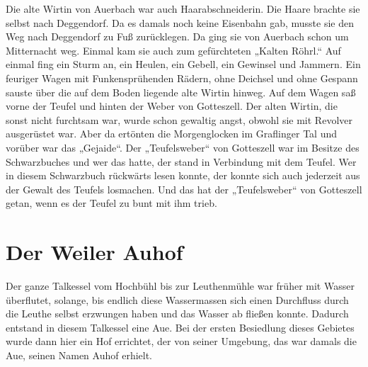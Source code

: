\documentclass[12pt,a4pager]{book}
\begin{document}
 Die alte Wirtin von Auerbach war auch Haarabschneiderin. Die Haare brachte sie
 selbst nach Deggendorf. Da es damals noch keine Eisenbahn gab, musste sie den
 Weg nach Deggendorf zu Fuß zurücklegen. Da ging sie von Auerbach schon um
 Mitternacht weg. Einmal kam sie auch zum gefürchteten „Kalten Röhrl.“ Auf
 einmal fing ein Sturm an, ein Heulen, ein Gebell, ein Gewinsel und Jammern. Ein
 feuriger Wagen mit Funkensprühenden Rädern, ohne Deichsel und ohne Gespann
 sauste über die auf dem Boden liegende alte Wirtin hinweg. Auf dem Wagen saß
 vorne der Teufel und hinten der Weber von Gotteszell. Der alten Wirtin, die
 sonst nicht furchtsam war, wurde schon gewaltig angst, obwohl sie mit Revolver
 ausgerüstet war. Aber da ertönten die Morgenglocken im Graflinger Tal und
 vorüber war das „Gejaide“. Der „Teufelsweber“ von Gotteszell war im Besitze des
 Schwarzbuches und wer das hatte, der stand in Verbindung mit dem Teufel. Wer in
 diesem Schwarzbuch rückwärts lesen konnte, der konnte sich auch jederzeit aus
 der Gewalt des Teufels losmachen. Und das hat der „Teufelsweber“ von Gotteszell
 getan, wenn es der Teufel zu bunt mit ihm trieb.

\section{Der Weiler Auhof}

Der ganze Talkessel vom Hochbühl bis zur Leuthenmühle war früher mit Wasser
überflutet, solange, bis endlich diese Wassermassen sich einen Durchfluss durch
die Leuthe selbst erzwungen haben und das Wasser ab fließen konnte. Dadurch
entstand in diesem Talkessel eine Aue. Bei der ersten Besiedlung dieses Gebietes
wurde dann hier ein Hof errichtet, der von seiner Umgebung, das war damals die
Aue, seinen Namen Auhof erhielt.
\end{document}
